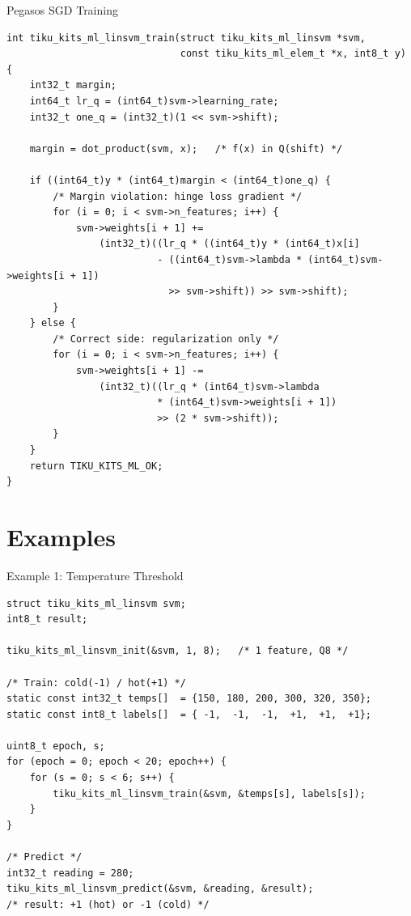 \documentclass[aspectratio=169, 10pt]{beamer}
\begin{document}
\begin{frame}[fragile]{Pegasos SGD Training}
\begin{lstlisting}[style=cstyle,
  title={tiku\_kits\_ml\_linsvm.c --- train (simplified)}]
int tiku_kits_ml_linsvm_train(struct tiku_kits_ml_linsvm *svm,
                              const tiku_kits_ml_elem_t *x, int8_t y)
{
    int32_t margin;
    int64_t lr_q = (int64_t)svm->learning_rate;
    int32_t one_q = (int32_t)(1 << svm->shift);

    margin = dot_product(svm, x);   /* f(x) in Q(shift) */

    if ((int64_t)y * (int64_t)margin < (int64_t)one_q) {
        /* Margin violation: hinge loss gradient */
        for (i = 0; i < svm->n_features; i++) {
            svm->weights[i + 1] +=
                (int32_t)((lr_q * ((int64_t)y * (int64_t)x[i]
                          - ((int64_t)svm->lambda * (int64_t)svm->weights[i + 1])
                            >> svm->shift)) >> svm->shift);
        }
    } else {
        /* Correct side: regularization only */
        for (i = 0; i < svm->n_features; i++) {
            svm->weights[i + 1] -=
                (int32_t)((lr_q * (int64_t)svm->lambda
                          * (int64_t)svm->weights[i + 1])
                          >> (2 * svm->shift));
        }
    }
    return TIKU_KITS_ML_OK;
}
\end{lstlisting}
\end{frame}

\section{Examples}

\begin{frame}[fragile]{Example 1: Temperature Threshold}
\begin{lstlisting}[style=cstyle,
  title={examples/example\_ml\_linsvm.c --- hot/cold binary classification}]
struct tiku_kits_ml_linsvm svm;
int8_t result;

tiku_kits_ml_linsvm_init(&svm, 1, 8);   /* 1 feature, Q8 */

/* Train: cold(-1) / hot(+1) */
static const int32_t temps[]  = {150, 180, 200, 300, 320, 350};
static const int8_t labels[]  = { -1,  -1,  -1,  +1,  +1,  +1};

uint8_t epoch, s;
for (epoch = 0; epoch < 20; epoch++) {
    for (s = 0; s < 6; s++) {
        tiku_kits_ml_linsvm_train(&svm, &temps[s], labels[s]);
    }
}

/* Predict */
int32_t reading = 280;
tiku_kits_ml_linsvm_predict(&svm, &reading, &result);
/* result: +1 (hot) or -1 (cold) */
\end{lstlisting}
\end{frame}
\end{document}
